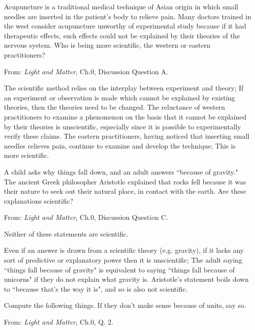 \documentclass[addpoints,12pt]{exam}
\begin{document}
\begin{questions}
\question[5]
Acupuncture is a traditional medical technique of Asian origin in which small needles are inserted in the patient’s body to relieve pain. Many doctors trained in the west consider acupuncture unworthy of experimental study because if it had therapeutic effects, such effects could not be explained by their theories of the nervous system. Who is being more scientific, the western or eastern practitioners?

From: \textit{Light and Matter}, Ch.0, Discussion Question A.
\begin{TheSolution}
The scientific method relies on the interplay between experiment and theory; If an experiment or observation is made which cannot be explained by existing theories, then the theories need to be changed. The reluctance of western practitioners to examine a phenomenon on the basis that it cannot be explained by their theories is unscientific, especially since it is possible to experimentally verify these claims. The eastern practitioners, having noticed that inserting small needles relieves pain, continue to examine and develop the technique; This is more scientific.
\end{TheSolution}

\question[5]
A child asks why things fall down, and an adult answers ``because of gravity." The ancient Greek philosopher Aristotle explained that rocks fell because it was their nature to seek out their natural place, in contact with the earth. Are these explanations scientific? 

From: \textit{Light and Matter}, Ch.0, Discussion Question C.
\begin{TheSolution}
Neither of these statements are scientific.

Even if an answer is drawn from a scientific theory (e.g. gravity), if it lacks any sort of predictive or explanatory power then it is unscientific; The adult saying ``things fall because of gravity" is equivalent to saying ``things fall because of unicorns" if they do not explain what gravity is. Aristotle's statement boils down to ``because that's the way it is", and so is also not scientific.
\end{TheSolution}

\question[4]
Compute the following things. If they don't make sense because of units, say so.

From: \textit{Light and Matter}, Ch.0, Q. 2.
\end{questions}
\end{document}
